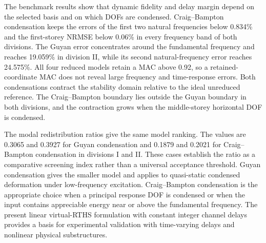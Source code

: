 \documentclass[a4paper,fleqn,review,12pt]{cas-sc}
\numberwithin{equation}{section}
\begin{document}
The benchmark results show that dynamic fidelity and delay margin depend on the selected basis and on which DOFs are condensed. Craig--Bampton condensation keeps the errors of the first two natural frequencies below 0.834\% and the first-storey NRMSE below 0.06\% in every frequency band of both divisions. The Guyan error concentrates around the fundamental frequency and reaches 19.059\% in division II, while its second natural-frequency error reaches 24.575\%. All four reduced models retain a MAC above 0.92, so a retained-coordinate MAC does not reveal large frequency and time-response errors. Both condensations contract the stability domain relative to the ideal unreduced reference. The Craig--Bampton boundary lies outside the Guyan boundary in both divisions, and the contraction grows when the middle-storey horizontal DOF is condensed.

The modal redistribution ratios give the same model ranking. The values are 0.3065 and 0.3927 for Guyan condensation and 0.1879 and 0.2021 for Craig--Bampton condensation in divisions I and II. These cases establish the ratio as a comparative screening index rather than a universal acceptance threshold. Guyan condensation gives the smaller model and applies to quasi-static condensed deformation under low-frequency excitation. Craig--Bampton condensation is the appropriate choice when a principal response DOF is condensed or when the input contains appreciable energy near or above the fundamental frequency. The present linear virtual-RTHS formulation with constant integer channel delays provides a basis for experimental validation with time-varying delays and nonlinear physical substructures.



\end{document}
